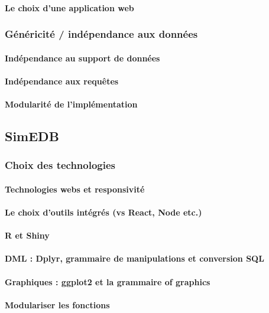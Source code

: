 			\paragraph*{Le choix d'une application web}
		\subsubsection{Généricité / indépendance aux données}
			\paragraph*{Indépendance au support de données}
			\paragraph*{Indépendance aux requêtes}
			\paragraph*{Modularité de l'implémentation}

	\subsection{SimEDB}
		\subsubsection{Choix des technologies}
			\paragraph*{Technologies webs et responsivité}
			\paragraph*{Le choix d'outils intégrés (vs React, Node etc.)}
			\paragraph*{R et Shiny}
			\paragraph*{DML : Dplyr, grammaire de manipulations et conversion SQL}
			\paragraph*{Graphiques : ggplot2 et la grammaire of graphics}
			\paragraph*{Modulariser les fonctions}
